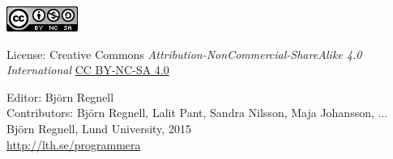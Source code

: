 { \vspace{250mm}\fontsize{11}{11}\flushleft\selectfont 
\vspace*{\fill}
\includegraphics{../img/cc.png}

License: Creative Commons {\it Attribution-NonCommercial-ShareAlike 4.0 International} 
\href{http://creativecommons.org/licenses/by-nc-sa/4.0/}{CC BY-NC-SA 4.0}

Editor: Björn Regnell\\
Contributors: Björn Regnell, Lalit Pant, Sandra Nilsson, Maja Johansson, ... \\
\textcopyright{ }Björn Regnell, Lund University, 2015 \\
\url{http://lth.se/programmera}
}